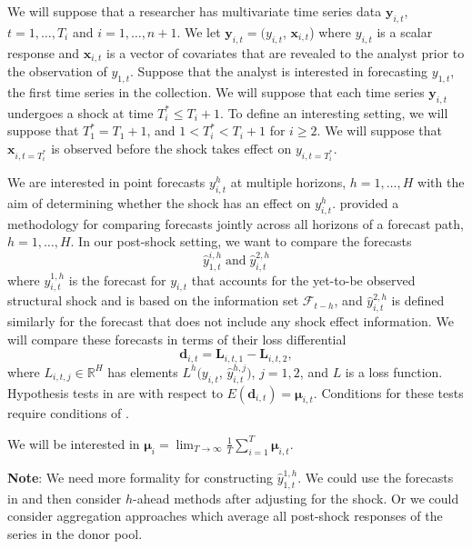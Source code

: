\documentclass[11pt]{article}
\newcommand{\R}{\mathbb{R}}
\newcommand{\x}{\textbf{x}}
\newcommand{\dbf}{\textbf{d}}
\newcommand{\y}{\textbf{y}}
\newcommand{\L}{\textbf{L}}
\def\mbf#1{\mathbf{#1}} %
\theoremstyle{definition}
\begin{document}
We will suppose that a researcher has multivariate time series data $\y_{i,t}$, $t = 1, \ldots,  T_i$ and $i = 1, \ldots, n+1$. We let $\y_{i,t} = (y_{i,t}$, $\x_{i,t}$) where $y_{i,t}$ is a scalar response and $\x_{i,t}$ is a vector of covariates that are revealed to the analyst prior to the observation of $y_{1,t}$.  Suppose that the analyst is interested in forecasting $y_{1,t}$, the first time series in the collection. 
We will suppose that each time series $\y_{i,t}$ undergoes a shock at time $T^*_i \leq T_i + 1$. To define an interesting setting, we will suppose that $T^*_1 = T_1 + 1$, and $1 < T^*_i < T_i + 1$ for $i \geq 2$. 
We will suppose that $\x_{i,t=T^*_i}$ is observed before the shock takes effect on $y_{i,t=T^*_i}$.

We are interested in point forecasts $y_{i,t}^h$ at multiple horizons, $h = 1, \ldots, H$ with the aim of determining whether the shock has an effect on $y_{i,t}^h$.
\cite{quaedvlieg2021multi} provided a methodology for comparing forecasts jointly across all horizons of a forecast path, $h = 1,\ldots, H$. In our post-shock setting, we want to compare the forecasts 
$$
  \hat y^{i,h}_{1,t} \; \text{and} \; \hat y^{2,h}_{i,t}
$$
where $y^{1,h}_{i,t}$ is the forecast for $y_{i,t}$ that accounts for the yet-to-be observed structural shock and is based on the information set $\mathcal{F}_{t-h}$, and $\hat y^{2,h}_{i,t}$ is defined similarly for the forecast that does not include any shock effect information. We will compare these forecasts in terms of their loss differential
$$
  \dbf_{i,t} = \L_{i,t,1} - \L_{i,t,2},
$$
where $L_{i,t,j} \in \R^H$ has elements $L^h(y_{i,t}$, $\hat y_{i,t}^{h,j})$, $j = 1,2$, and $L$ is a loss function. Hypothesis tests in \cite{quaedvlieg2021multi} are with respect to $E(\dbf_{i,t}) = \mbf\mu_{i,t}$. Conditions for these tests require conditions of \cite{giacomini2006tests}. 

We will be interested in $\mathbf{\mu}_i = \lim_{T\to\infty}\frac{1}{T}\sum_{i=1}^T \mathbf{\mu}_{i,t}$.



\vspace*{0.5cm}\noindent\textbf{Note}: We need more formality for constructing $\hat y^{1,h}_{1,t}$. We could use the forecasts in \cite{lin2021minimizing} and then consider $h$-ahead methods after adjusting for the shock. Or we could consider aggregation approaches which average all post-shock responses of the series in the donor pool. 
\vspace*{0.5cm}
\end{document}
